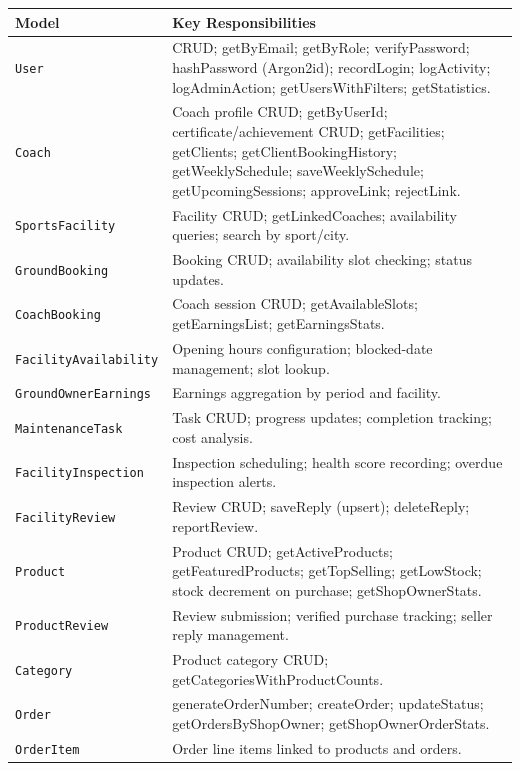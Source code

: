 \documentclass[12pt,a4paper]{report}
\begin{document}
\begin{center}
\begin{longtable}{p{4.8cm} p{9.7cm}}
\toprule
\textbf{Model} & \textbf{Key Responsibilities}\\
\midrule
\endhead
\texttt{User}                 & CRUD; getByEmail; getByRole; verifyPassword; hashPassword (Argon2id); recordLogin; logActivity; logAdminAction; getUsersWithFilters; getStatistics.\\
\texttt{Coach}                & Coach profile CRUD; getByUserId; certificate/achievement CRUD; getFacilities; getClients; getClientBookingHistory; getWeeklySchedule; saveWeeklySchedule; getUpcomingSessions; approveLink; rejectLink.\\
\texttt{SportsFacility}       & Facility CRUD; getLinkedCoaches; availability queries; search by sport/city.\\
\texttt{GroundBooking}        & Booking CRUD; availability slot checking; status updates.\\
\texttt{CoachBooking}         & Coach session CRUD; getAvailableSlots; getEarningsList; getEarningsStats.\\
\texttt{FacilityAvailability} & Opening hours configuration; blocked-date management; slot lookup.\\
\texttt{GroundOwnerEarnings}  & Earnings aggregation by period and facility.\\
\texttt{MaintenanceTask}      & Task CRUD; progress updates; completion tracking; cost analysis.\\
\texttt{FacilityInspection}   & Inspection scheduling; health score recording; overdue inspection alerts.\\
\texttt{FacilityReview}       & Review CRUD; saveReply (upsert); deleteReply; reportReview.\\
\texttt{Product}              & Product CRUD; getActiveProducts; getFeaturedProducts; getTopSelling; getLowStock; stock decrement on purchase; getShopOwnerStats.\\
\texttt{ProductReview}        & Review submission; verified purchase tracking; seller reply management.\\
\texttt{Category}             & Product category CRUD; getCategoriesWithProductCounts.\\
\texttt{Order}                & generateOrderNumber; createOrder; updateStatus; getOrdersByShopOwner; getShopOwnerOrderStats.\\
\texttt{OrderItem}            & Order line items linked to products and orders.\\

\end{longtable}
\end{center}
\end{document}
